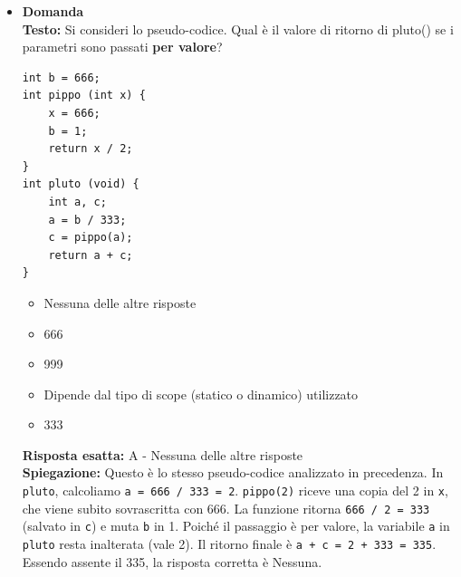 \documentclass[12pt, a4paper]{article}
\newcounter{domandateoria}
\begin{document}
\begin{itemize}
    \item {}\textbf{Domanda \thedomandateoria} \\
    \textbf{Testo:} Si consideri lo pseudo-codice. Qual è il valore di ritorno di pluto() se i parametri sono passati \textbf{per valore}?
\begin{verbatim}
int b = 666;
int pippo (int x) {
    x = 666;
    b = 1;
    return x / 2;
}
int pluto (void) {
    int a, c;
    a = b / 333;
    c = pippo(a);
    return a + c;
}
\end{verbatim}
    \begin{itemize}
        \item[A)] Nessuna delle altre risposte
        \item[B)] 666
        \item[C)] 999
        \item[D)] Dipende dal tipo di scope (statico o dinamico) utilizzato
        \item[E)] 333
    \end{itemize}
    \textbf{Risposta esatta:} A - Nessuna delle altre risposte \\
    \textbf{Spiegazione:} Questo è lo stesso pseudo-codice analizzato in precedenza. In \texttt{pluto}, calcoliamo \texttt{a = 666 / 333 = 2}. \texttt{pippo(2)} riceve una copia del 2 in \texttt{x}, che viene subito sovrascritta con 666. La funzione ritorna \texttt{666 / 2 = 333} (salvato in \texttt{c}) e muta \texttt{b} in 1. Poiché il passaggio è per valore, la variabile \texttt{a} in \texttt{pluto} resta inalterata (vale 2). Il ritorno finale è \texttt{a + c = 2 + 333 = 335}. Essendo assente il 335, la risposta corretta è Nessuna.
    \vspace{0.3cm}


\end{itemize}
\end{document}
